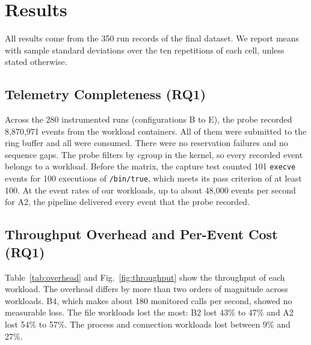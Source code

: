 \section{Results}
\label{sec:results}

All results come from the 350 run records of the final dataset. We report means with sample standard deviations over the ten repetitions of each cell, unless stated otherwise.

\subsection{Telemetry Completeness (RQ1)}
\label{sec:res-telemetry}

Across the 280 instrumented runs (configurations B to E), the probe recorded 8{,}870{,}971 events from the workload containers. All of them were submitted to the ring buffer and all were consumed. There were no reservation failures and no sequence gaps. The probe filters by cgroup in the kernel, so every recorded event belongs to a workload. Before the matrix, the capture test counted 101 \texttt{execve} events for 100 executions of \texttt{/bin/true}, which meets its pass criterion of at least 100. At the event rates of our workloads, up to about 48{,}000 events per second for A2, the pipeline delivered every event that the probe recorded.

\subsection{Throughput Overhead and Per-Event Cost (RQ1)}

Table~\ref{tab:overhead} and Fig.~\ref{fig:throughput} show the throughput of each workload. The overhead differs by more than two orders of magnitude across workloads. B4, which makes about 180 monitored calls per second, showed no measurable loss. The file workloads lost the most: B2 lost 43\% to 47\% and A2 lost 54\% to 57\%. The process and connection workloads lost between 9\% and 27\%.

